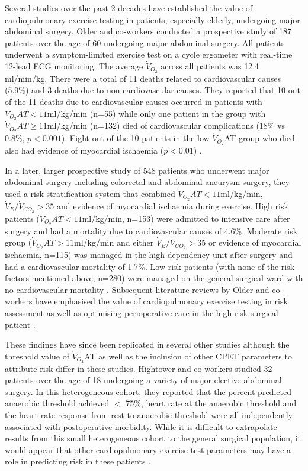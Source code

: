Several studies over the past 2 decades have established the value of cardiopulmonary exercise testing in patients, especially elderly, undergoing major abdominal surgery. 
Older and co-workers conducted a prospective study of 187 patients over the age of 60 undergoing major abdominal surgery. 
All patients underwent a symptom-limited exercise test on a cycle ergometer with real-time 12-lead ECG monitoring. 
The average $\dot{V}_{O_2}$ across all patients was 12.4 ml/min/kg. 
There were a total of 11 deaths related to cardiovascular causes (5.9\%) and 3 deaths due to non-cardiovascular causes. 
They reported that 10 out of the 11 deaths due to cardiovascular causes occurred in patients with $\dot{V}_{O_2}AT<11$ml/kg/min (n=55) while only one patient in the group with $\dot{V}_{O_2}AT\geq11$ml/kg/min (n=132) died of cardiovascular complications (18\% vs 0.8\%, $p<0.001$). 
Eight out of the 10 patients in the low $\dot{V}_{O_2}$AT group who died also had evidence of myocardial ischaemia ($p<0.01$) \parencite{older_preoperative_1993}. 

In a later, larger prospective study of 548 patients who underwent major abdominal surgery including colorectal and abdominal aneurysm surgery, they used a risk stratification system that combined $\dot{V}_{O_2}AT<11$ml/kg/min, $\dot{V}_E/\dot{V}_{CO_2}>35$ and evidence of myocardial ischaemia during exercise. 
High risk patients ($\dot{V}_{O_2}AT<11$ml/kg/min, n=153) were admitted to intensive care after surgery and had a mortality due to cardiovascular causes of 4.6\%. 
Moderate risk group ($\dot{V}_{O_2}AT>11$ml/kg/min and either $\dot{V}_E/\dot{V}_{CO_2}>35$ or evidence of myocardial ischaemia, n=115) was managed in the high dependency unit after surgery and had a cardiovascular mortality of 1.7\%. 
Low risk patients (with none of the risk factors mentioned above, n=280) were managed on the general surgical ward with no cardiovascular mortality \parencite{older_cardiopulmonary_1999}. 
Subsequent literature reviews by Older and co-workers have emphasised the value of cardiopulmonary exercise testing in risk assessment as well as optimising perioperative care in the high-risk surgical patient \parencite{older_preoperative_2000, older_clinical_2004, older_preoperative_2005}. 

These findings have since been replicated in several other studies although the threshold value of $\dot{V}_{O_2}$AT as well as the inclusion of other CPET parameters to attribute risk differ in these studies. 
Hightower and co-workers studied 32 patients over the age of 18 undergoing a variety of major elective abdominal surgery. 
In this heterogeneous cohort, they reported that the percent predicted anaerobic threshold achieved $<$ 75\%, heart rate at the anaerobic threshold and the heart rate response from rest to anaerobic threshold were all independently associated with postoperative morbidity. 
While it is difficult to extrapolate results from this small heterogeneous cohort to the general surgical population, it would appear that other cardiopulmonary exercise test parameters may have a role in predicting risk in these patients \parencite{hightower_pilot_2010}. 


